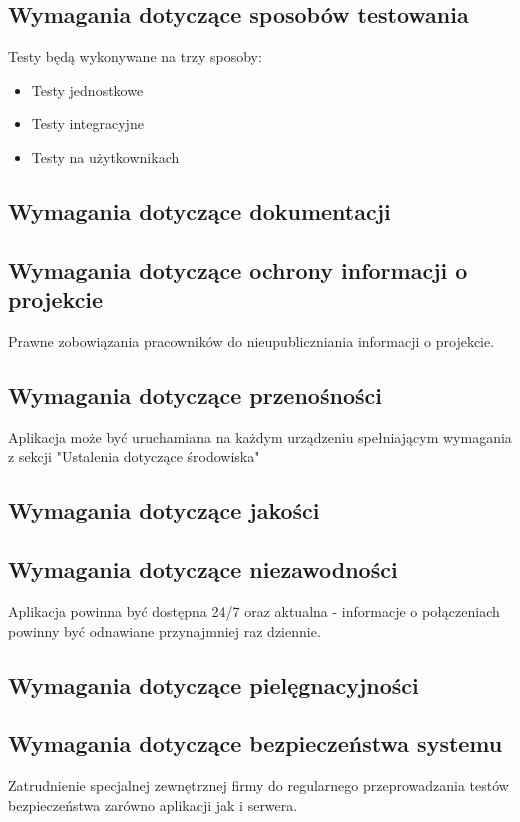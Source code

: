 \documentclass[12pt,a4paper]{report}
\begin{document}
\subsection{Wymagania dotyczące sposobów testowania}
Testy będą wykonywane na trzy sposoby:
\begin{itemize}
	\item Testy jednostkowe
	\item Testy integracyjne
	\item Testy na użytkownikach
\end{itemize}
\subsection{Wymagania dotyczące dokumentacji}
\subsection{Wymagania dotyczące ochrony informacji o projekcie}
	Prawne zobowiązania pracowników do nieupubliczniania informacji o projekcie.
\subsection{Wymagania dotyczące przenośności}
	Aplikacja może być uruchamiana na każdym urządzeniu spełniającym wymagania z sekcji "Ustalenia dotyczące środowiska"
\subsection{Wymagania dotyczące jakości}
\subsection{Wymagania dotyczące niezawodności}
	Aplikacja powinna być dostępna 24/7 oraz aktualna - informacje o połączeniach powinny być odnawiane przynajmniej raz dziennie.
\subsection{Wymagania dotyczące pielęgnacyjności}
	
\subsection{Wymagania dotyczące bezpieczeństwa systemu}
	Zatrudnienie specjalnej zewnętrznej firmy do regularnego przeprowadzania testów bezpieczeństwa zarówno aplikacji jak i serwera. 
\end{document}
